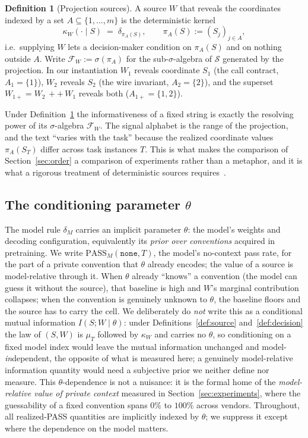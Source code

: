 \documentclass[11pt]{article}
\theoremstyle{plain}
\theoremstyle{definition}
\newtheorem{definition}{Definition}
\theoremstyle{remark}
\newcommand{\PASS}{\mathrm{PASS}}
\newcommand{\Scal}{\mathcal{S}}
\newcommand{\Fcal}{\mathcal{F}}
\begin{document}
\begin{definition}[Projection sources]
\label{def:projection}
A source $W$ that reveals the coordinates indexed by a
set $A \subseteq \{1,\dots,m\}$ is the deterministic kernel
\begin{equation}
\label{eq:projkernel}
\kappa_{W}(\cdot \mid S) \;=\; \delta_{\pi_A(S)}, \qquad \pi_A(S) := (S_j)_{j\in A},
\end{equation}
i.e.\ supplying $W$ lets a decision-maker condition on $\pi_A(S)$ and on nothing outside $A$.
Write $\Fcal_W := \sigma(\pi_A)$ for the sub-$\sigma$-algebra of $\Scal$ generated by
the projection. In our instantiation $W_1$ reveals coordinate $S_1$ (the call contract,
$A_1=\{1\}$), $W_2$ reveals $S_2$ (the wire invariant, $A_2=\{2\}$), and the superset
$W_{1+} = W_2 \,{+}{+}\, W_1$ reveals both ($A_{1+}=\{1,2\}$).
\end{definition}

Under Definition~\ref{def:projection} the informativeness of a fixed string is exactly the
resolving power of its $\sigma$-algebra $\Fcal_W$. The signal alphabet is the range of the
projection, and the text ``varies with the task'' because the realized coordinate values
$\pi_A(S_T)$ differ across task instances $T$. This is what makes the comparison of
Section~\ref{sec:order} a comparison of experiments rather than a metaphor, and it is what a
rigorous treatment of deterministic sources requires~\citep{torgersen1991}.

\subsection{The conditioning parameter \texorpdfstring{$\theta$}{theta}}
\label{subsec:theta}

The model rule $\delta_M$ carries an implicit parameter $\theta$: the model's weights and decoding
configuration, equivalently its \emph{prior over conventions} acquired in pretraining. We write
$\PASS_M(\texttt{none},T)$, the model's no-context pass rate, for the part of a private convention
that $\theta$ already encodes; the value of a source is model-relative through it. When $\theta$
already ``knows'' a convention (the model can guess it without the source), that baseline is high
and $W$'s marginal contribution collapses; when the convention is genuinely unknown to $\theta$,
the baseline floors and the source has to carry the cell. We deliberately do \emph{not} write this
as a conditional mutual information $I(S;W\mid\theta)$: under Definitions~\ref{def:source}
and~\ref{def:decision} the law of $(S,W)$ is $\mu_T$ followed by $\kappa_W$ and carries no
$\theta$, so conditioning on a fixed model index would leave the mutual information unchanged and
model-\emph{in}dependent, the opposite of what is measured here; a genuinely model-relative
information quantity would need a subjective prior we neither define nor measure. This
$\theta$-dependence is not a nuisance: it is
the formal home of the \emph{model-relative value of private context} measured in
Section~\ref{sec:experiments}, where the guessability of a fixed convention spans $0\%$ to $100\%$ across
vendors. Throughout, all realized-PASS quantities are implicitly indexed by $\theta$; we suppress
it except where the dependence on the model matters.
\end{document}
